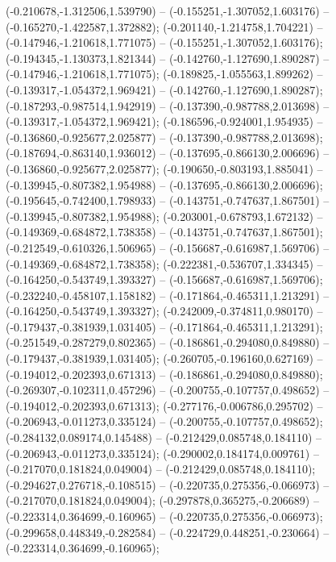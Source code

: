  (-0.210678,-1.312506,1.539790) -- (-0.155251,-1.307052,1.603176) -- (-0.165270,-1.422587,1.372882);
 (-0.201140,-1.214758,1.704221) -- (-0.147946,-1.210618,1.771075) -- (-0.155251,-1.307052,1.603176);
 (-0.194345,-1.130373,1.821344) -- (-0.142760,-1.127690,1.890287) -- (-0.147946,-1.210618,1.771075);
 (-0.189825,-1.055563,1.899262) -- (-0.139317,-1.054372,1.969421) -- (-0.142760,-1.127690,1.890287);
 (-0.187293,-0.987514,1.942919) -- (-0.137390,-0.987788,2.013698) -- (-0.139317,-1.054372,1.969421);
 (-0.186596,-0.924001,1.954935) -- (-0.136860,-0.925677,2.025877) -- (-0.137390,-0.987788,2.013698);
 (-0.187694,-0.863140,1.936012) -- (-0.137695,-0.866130,2.006696) -- (-0.136860,-0.925677,2.025877);
 (-0.190650,-0.803193,1.885041) -- (-0.139945,-0.807382,1.954988) -- (-0.137695,-0.866130,2.006696);
 (-0.195645,-0.742400,1.798933) -- (-0.143751,-0.747637,1.867501) -- (-0.139945,-0.807382,1.954988);
 (-0.203001,-0.678793,1.672132) -- (-0.149369,-0.684872,1.738358) -- (-0.143751,-0.747637,1.867501);
 (-0.212549,-0.610326,1.506965) -- (-0.156687,-0.616987,1.569706) -- (-0.149369,-0.684872,1.738358);
 (-0.222381,-0.536707,1.334345) -- (-0.164250,-0.543749,1.393327) -- (-0.156687,-0.616987,1.569706);
 (-0.232240,-0.458107,1.158182) -- (-0.171864,-0.465311,1.213291) -- (-0.164250,-0.543749,1.393327);
 (-0.242009,-0.374811,0.980170) -- (-0.179437,-0.381939,1.031405) -- (-0.171864,-0.465311,1.213291);
 (-0.251549,-0.287279,0.802365) -- (-0.186861,-0.294080,0.849880) -- (-0.179437,-0.381939,1.031405);
 (-0.260705,-0.196160,0.627169) -- (-0.194012,-0.202393,0.671313) -- (-0.186861,-0.294080,0.849880);
 (-0.269307,-0.102311,0.457296) -- (-0.200755,-0.107757,0.498652) -- (-0.194012,-0.202393,0.671313);
 (-0.277176,-0.006786,0.295702) -- (-0.206943,-0.011273,0.335124) -- (-0.200755,-0.107757,0.498652);
 (-0.284132,0.089174,0.145488) -- (-0.212429,0.085748,0.184110) -- (-0.206943,-0.011273,0.335124);
 (-0.290002,0.184174,0.009761) -- (-0.217070,0.181824,0.049004) -- (-0.212429,0.085748,0.184110);
 (-0.294627,0.276718,-0.108515) -- (-0.220735,0.275356,-0.066973) -- (-0.217070,0.181824,0.049004);
 (-0.297878,0.365275,-0.206689) -- (-0.223314,0.364699,-0.160965) -- (-0.220735,0.275356,-0.066973);
 (-0.299658,0.448349,-0.282584) -- (-0.224729,0.448251,-0.230664) -- (-0.223314,0.364699,-0.160965);
